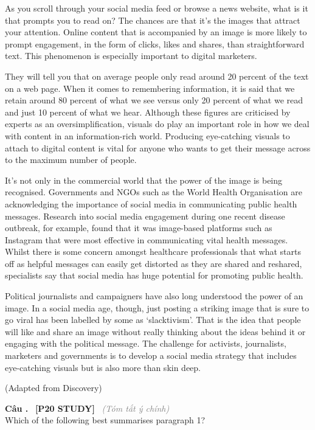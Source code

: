 \documentclass[12pt,a4paper,twoside]{article}
\newcounter{qcounter}
\newcommand{\question}[2][]{%
    \stepcounter{qcounter}%
    \par\vspace{6pt}%
    \noindent\textcolor{primaryBlue}{\textbf{Câu \theqcounter.}}~%
    \textcolor{secondaryBlue}{\small\textbf{[P20 STUDY]}}~%
    \if\relax\detokenize{#1}\relax\else\textcolor{gray}{\small\textit{(#1)}}~\fi\\[1pt]
    \noindent #2%
}
\newenvironment{readingpassage}[1][]{%
    \begin{tcolorbox}[enhanced, colback=grayLight, colframe=secondaryBlue,
        coltitle=textDark, fonttitle=\bfseries, title={#1},
        rounded corners, arc=3mm, boxrule=1pt,
        left=15pt, right=15pt, top=10pt, bottom=10pt,
        breakable, before skip=10pt, after skip=10pt, drop fuzzy shadow]
    \setstretch{1.3}
}{\end{tcolorbox}}
\begin{document}
\begin{readingpassage}[]
As you scroll through your social media feed or browse a news website, what is it that prompts you to read on? The chances are that it’s the images that attract your attention. Online content that is accompanied by an image is more likely to prompt engagement, in the form of clicks, likes and shares, than straightforward text. This phenomenon is especially important to digital marketers.

They will tell you that on average people only read around 20 percent of the text on a web page. When it comes to remembering information, it is said that we retain around 80 percent of what we see versus only 20 percent of what we read and just 10 percent of what we hear. Although these figures are criticised by experts as an oversimplification, visuals do play an important role in how we deal with content in an information-rich world. Producing eye-catching visuals to attach to digital content is vital for anyone who wants to get their message across to the maximum number of people.

It’s not only in the commercial world that the power of the image is being recognised. Governments and NGOs such as the World Health Organisation are acknowledging the importance of social media in communicating public health messages. Research into social media engagement during one recent disease outbreak, for example, found that it was image-based platforms such as Instagram that were most effective in communicating vital health messages. Whilst there is some concern amongst healthcare professionals that what starts off as helpful messages can easily get distorted as they are shared and reshared, specialists say that social media has huge potential for promoting public health.

Political journalists and campaigners have also long understood the power of an image. In a social media age, though, just posting a striking image that is sure to go viral has been labelled by some as ‘slacktivism’. That is the idea that people will like and share an image without really thinking about the ideas behind it or engaging with the political message. The challenge for activists, journalists, marketers and governments is to develop a social media strategy that includes eye-catching visuals but is also more than skin deep.

(Adapted from Discovery)
\end{readingpassage}

\question[Tóm tắt ý chính]{Which of the following best summarises paragraph 1?}
\end{document}
